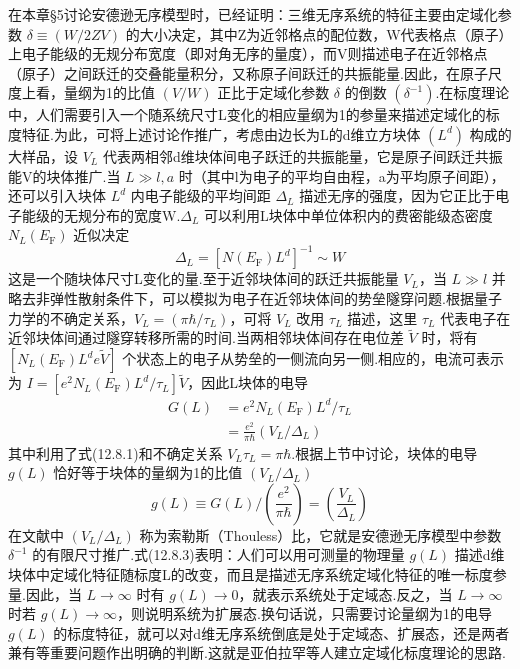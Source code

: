 在本章§5讨论安德逊无序模型时，已经证明：三维无序系统的特征主要由定域化参数 $\delta\equiv\left(W/2ZV\right)$ 的大小决定，其中Z为近邻格点的配位数，W代表格点（原子）上电子能级的无规分布宽度（即对角无序的量度），而V则描述电子在近邻格点（原子）之间跃迁的交叠能量积分，又称原子间跃迁的共振能量.因此，在原子尺度上看，量纲为1的比值 $\left(V/W\right)$ 正比于定域化参数 $\delta$ 的倒数 $\left(\delta^{-1}\right)$.在标度理论中，人们需要引入一个随系统尺寸L变化的相应量纲为1的参量来描述定域化的标度特征.为此，可将上述讨论作推广，考虑由边长为L的d维立方块体 $\left(L^{d}\right)$ 构成的大样品，设 $V_{L}$ 代表两相邻d维块体间电子跃迁的共振能量，它是原子间跃迁共振能V的块体推广.当 $L\gg l,a$ 时（其中l为电子的平均自由程，a为平均原子间距），还可以引入块体 $L^{d}$ 内电子能级的平均间距 $\Delta_{L}$ 描述无序的强度，因为它正比于电子能级的无规分布的宽度W.$\Delta_{L}$ 可以利用L块体中单位体积内的费密能级态密度 $N_{L}\left(E_{\mathrm{F}}\right)$ 近似决定
\begin{equation}
  \Delta_{L}=\left[N\left(E_{\mathrm{F}}\right)L^{d}\right]^{-1}\sim W
\end{equation}
这是一个随块体尺寸L变化的量.至于近邻块体间的跃迁共振能量 $V_{L}$，当 $L\gg l$ 并略去非弹性散射条件下，可以模拟为电子在近邻块体间的势垒隧穿问题.根据量子力学的不确定关系，$V_{L}=\left(\pi\hbar/\tau_{L}\right)$，可将 $V_{L}$ 改用 $\tau_{L}$ 描述，这里 $\tau_{L}$ 代表电子在近邻块体间通过隧穿转移所需的时间.当两相邻块体间存在电位差 $\widetilde{V}$ 时，将有 $\left[N_{L}\left(E_{\mathrm{F}}\right)L^{d}e\widetilde{V}\right]$ 个状态上的电子从势垒的一侧流向另一侧.相应的，电流可表示为 $I=\left[e^{2}N_{L}\left(E_{\mathrm{F}}\right)L^{d}/\tau_{L}\right]\widetilde{V}$，因此L块体的电导
\begin{equation}
\begin{aligned}
  G\left(L\right)&=e^{2}N_{L}\left(E_{\mathrm{F}}\right)L^{d}/\tau_{L}\\
  &=\frac{e^{2}}{\pi\hbar}\left(V_{L}/\Delta_{L}\right)
\end{aligned}
\end{equation}
其中利用了式(12.8.1)和不确定关系 $V_{L}\tau_{L}=\pi\hbar$.根据上节中讨论，块体的电导 $g\left(L\right)$ 恰好等于块体的量纲为1的比值 $\left(V_{L}/\Delta_{L}\right)$
\begin{equation}
  g\left(L\right)\equiv G\left(L\right)/\left(\frac{e^{2}}{\pi\hbar}\right)=\left(\frac{V_{L}}{\Delta_{L}}\right)
\end{equation}
在文献中 $\left(V_{L}/\Delta_{L}\right)$ 称为索勒斯（Thouless）比，它就是安德逊无序模型中参数 $\delta^{-1}$ 的有限尺寸推广.式(12.8.3)表明：人们可以用可测量的物理量 $g\left(L\right)$ 描述d维块体中定域化特征随标度L的改变，而且是描述无序系统定域化特征的唯一标度参量.因此，当 $L\rightarrow\infty$ 时有 $g\left(L\right)\rightarrow0$，就表示系统处于定域态.反之，当 $L\rightarrow\infty$ 时若 $g\left(L\right)\rightarrow\infty$，则说明系统为扩展态.换句话说，只需要讨论量纲为1的电导 $g\left(L\right)$ 的标度特征，就可以对d维无序系统倒底是处于定域态、扩展态，还是两者兼有等重要问题作出明确的判断.这就是亚伯拉罕等人建立定域化标度理论的思路.

